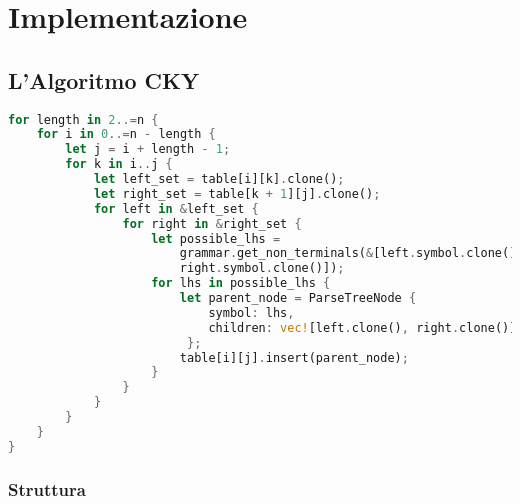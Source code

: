 \chapter{Implementazione}

\section{L'Algoritmo CKY}

\begin{lstlisting}[language=rust, caption = Algoritmo CKY]
for length in 2..=n {
    for i in 0..=n - length {
        let j = i + length - 1;
        for k in i..j {
            let left_set = table[i][k].clone();
            let right_set = table[k + 1][j].clone();
            for left in &left_set {
                for right in &right_set {
                    let possible_lhs =
                        grammar.get_non_terminals(&[left.symbol.clone(), 
                        right.symbol.clone()]);
                    for lhs in possible_lhs {
                        let parent_node = ParseTreeNode {
                            symbol: lhs,
                            children: vec![left.clone(), right.clone()],
                         };
                        table[i][j].insert(parent_node);
                    }
                }
            }
        }
    }
}


\end{lstlisting}

\subsection{Struttura}

